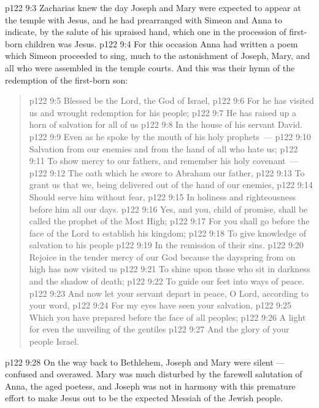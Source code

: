\vs p122 9:3 Zacharias knew the day Joseph and Mary were expected to appear at the temple with Jesus, and he had prearranged with Simeon and Anna to indicate, by the salute of his upraised hand, which one in the procession of first\hyp{}born children was Jesus.
\vs p122 9:4 For this occasion Anna had written a poem which Simeon proceeded to sing, much to the astonishment of Joseph, Mary, and all who were assembled in the temple courts. And this was their hymn of the redemption of the first\hyp{}born son:
\begin{quote}
\vs p122 9:5 Blessed be the Lord, the God of Israel,
\vs p122 9:6 For he has visited us and wrought redemption for his people;
\vs p122 9:7 He has raised up a horn of salvation for all of us
\vs p122 9:8 In the house of his servant David.
\vs p122 9:9 Even as he spoke by the mouth of his holy prophets~---
\vs p122 9:10 Salvation from our enemies and from the hand of all who hate us;
\vs p122 9:11 To show mercy to our fathers, and remember his holy covenant~---
\vs p122 9:12 The oath which he swore to Abraham our father,
\vs p122 9:13 To grant us that we, being delivered out of the hand of our enemies,
\vs p122 9:14 Should serve him without fear,
\vs p122 9:15 In holiness and righteousness before him all our days.
\vs p122 9:16 Yes, and you, child of promise, shall be called the prophet of the Most High;
\vs p122 9:17 For you shall go before the face of the Lord to establish his kingdom;
\vs p122 9:18 To give knowledge of salvation to his people
\vs p122 9:19 In the remission of their sins.
\vs p122 9:20 Rejoice in the tender mercy of our God because the dayspring from on high has now visited us
\vs p122 9:21 To shine upon those who sit in darkness and the shadow of death;
\vs p122 9:22 To guide our feet into ways of peace.
\vs p122 9:23 And now let your servant depart in peace, O Lord, according to your word,
\vs p122 9:24 For my eyes have seen your salvation,
\vs p122 9:25 Which you have prepared before the face of all peoples;
\vs p122 9:26 A light for even the unveiling of the gentiles
\vs p122 9:27 And the glory of your people Israel.
\end{quote}
\vs p122 9:28 \pc On the way back to Bethlehem, Joseph and Mary were silent --- confused and overawed. Mary was much disturbed by the farewell salutation of Anna, the aged poetess, and Joseph was not in harmony with this premature effort to make Jesus out to be the expected Messiah of the Jewish people.
